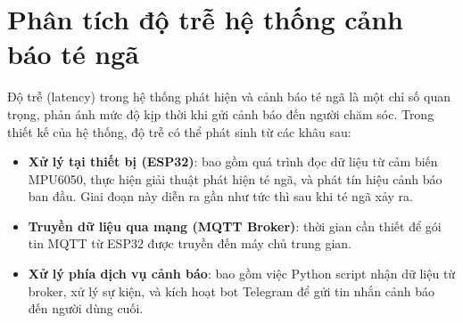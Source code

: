 
\section{Phân tích độ trễ hệ thống cảnh báo té ngã}
\label{sec:latency_analysis}

Độ trễ (latency) trong hệ thống phát hiện và cảnh báo té ngã là một chỉ số quan trọng, phản ánh mức độ kịp thời khi gửi cảnh báo đến người chăm sóc. Trong thiết kế của hệ thống, độ trễ có thể phát sinh từ các khâu sau:

\begin{itemize}
    \item \textbf{Xử lý tại thiết bị (ESP32)}: bao gồm quá trình đọc dữ liệu từ cảm biến MPU6050, thực hiện giải thuật phát hiện té ngã, và phát tín hiệu cảnh báo ban đầu. Giai đoạn này diễn ra gần như tức thì sau khi té ngã xảy ra.
    \item \textbf{Truyền dữ liệu qua mạng (MQTT Broker)}: thời gian cần thiết để gói tin MQTT từ ESP32 được truyền đến máy chủ trung gian.
    \item \textbf{Xử lý phía dịch vụ cảnh báo}: bao gồm việc Python script nhận dữ liệu từ broker, xử lý sự kiện, và kích hoạt bot Telegram để gửi tin nhắn cảnh báo đến người dùng cuối.
\end{itemize}

